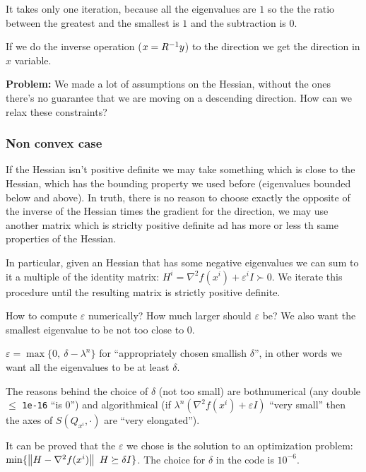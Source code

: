 \documentclass[computational_mathematics.tex]{subfiles}
\begin{document}
It takes only one iteration, because all the eigenvalues are $1$ so the the ratio between the greatest and the smallest is $1$ and the subtraction is $0$.

If we do the inverse operation ($x = {R}^{-1} y$) to the direction we get the direction in $x$ variable.

\begin{myframe}{\bf Problem:}
We made a lot of assumptions on the Hessian, without the ones there's no guarantee that we are moving on a descending direction. How can we relax these constraints?
\end{myframe}

\subsubsection{Non convex case}

If the Hessian isn't positive definite we may take something which is close to the Hessian, which has the bounding property we used before (eigenvalues bounded below and above). In truth, there is no reason to choose exactly the opposite of the inverse of the Hessian times the gradient for the direction, we may use another matrix which is striclty positive definite ad has more or less th same properties of the Hessian.

In particular, given an Hessian that has some negative eigenvalues we can sum to it a multiple of the identity matrix: $H^i = \nabla^2 f(x^i) + \varepsilon^i I \succ 0$. We iterate this procedure until the resulting matrix is strictly positive definite.

How to compute $\varepsilon$ numerically? How much larger should $\varepsilon$ be? We also want the smallest eigenvalue to be not too close to $0$.

 $\varepsilon = \max \{0,~  \delta - \lambda^n\}$ for ``appropriately chosen smallish $\delta$'', in other words we want all the eigenvalues to be at least $\delta$.

 The reasons behind the choice of $\delta$ (not too small) are bothnumerical (any double $\leq$ {\tt 1e-16} ``is $0$'') and algorithmical (if $\lambda^n(\nabla^2 f(x^i) + \varepsilon I)$ ``very small'' then the axes of $S(Q_{x^i}, \cdot)$ are ``very elongated'').

 It can be proved that the $\varepsilon$ we chose is the solution to an optimization problem: $\min \{\left\lVert H - \nabla^2 f(x^i)\right\rVert ~ H \succeq \delta I\}$. The choice for $\delta$ in the code is $10^{-6}$.
\end{document}
